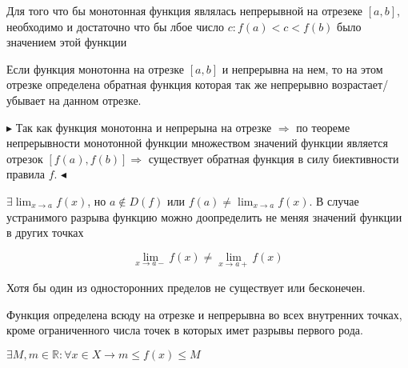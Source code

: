 \documentclass[14pt]{extreport}
\begin{document}
        \begin{theorem}
            Для того что бы монотонная функция являлась непрерывной на отрезеке $[a,b]$, необходимо и достаточно что бы лбое число $c: f(a)<c<f(b)$ было значением этой функции
        \end{theorem}

        \begin{theorem}
            Если функция монотонна на отрезке $[a,b]$ и непрерывна на нем, то на этом отрезке определена обратная функция которая так же непрерывно возрастает/убывает на данном отрезке.
        \end{theorem}
        $\blacktriangleright$
            Так как функция монотонна и непрерына на отрезке $\Rightarrow$ по теореме непрерывности монотонной функции множеством значений функции является отрезок $[f(a), f(b)] \Rightarrow $ существует обратная функция в силу биективности правила $f$. 
        $\blacktriangleleft$

        \begin{definition}
                $\exists \lim_{x\rightarrow a}f(x)$, но $a \notin D(f)$ или $f(a) \ne \lim_{x\rightarrow a } f(x)$. В случае устранимого разрыва функцию можно доопределить не меняя значений функции в других точках
        \end{definition}

        \begin{definition}
            $$\lim_{x\rightarrow a-}f(x) \ne \lim_{x\rightarrow a+} f(x)$$
        \end{definition}

        \begin{definition}
            Хотя бы один из односторонних пределов не существует или бесконечен.
        \end{definition}

        \begin{definition}
            Функция определена всюду на отрезке и непрерывна во всех внутренних точках, кроме ограниченного числа точек в которых имет разрывы первого рода.
        \end{definition}

        \begin{definition}
            $\exists M, m \in \mathbb{R} : \forall x \in X \rightarrow m \leq f(x) \leq M$
        \end{definition}
\end{document}
